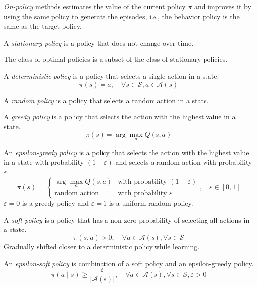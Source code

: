 \textit{On-policy} methods estimates the value of the current policy \( \pi \) and improves it by using the same policy to generate the episodes, i.e., the behavior policy is the same as the target policy.

A \textit{stationary policy} is a policy that does not change over time.

The class of optimal policies is a subset of the class of stationary policies.

A \textit{deterministic policy} is a policy that selects a single action in a state.
\begin{equation}
    \pi(s) = a, \quad \forall s \in \mathcal{S}, a \in \mathcal{A}(s)
\end{equation}

A \textit{random policy} is a policy that selects a random action in a state.

A \textit{greedy policy} is a policy that selects the action with the highest value in a state.
\begin{equation}
    \pi(s) = \arg\max_a Q(s, a)
\end{equation}

An \textit{epsilon-greedy policy} is a policy that selects the action with the highest value in a state with probability \( (1 - \varepsilon) \) and selects a random action with probability \( \varepsilon \).
\begin{equation}
    \pi(s) = \begin{cases}
        \arg\max_a Q(s, a)
         &
        \text{with probability } (1 - \varepsilon)
        \\
        \text{random action}
         &
        \text{with probability } \varepsilon
    \end{cases}
    , \quad \varepsilon \in [0, 1]
\end{equation}
\( \varepsilon = 0 \) is a greedy policy and \( \varepsilon = 1 \) is a uniform random policy.

A \textit{soft policy} is a policy that has a non-zero probability of selecting all actions in a state.
\begin{equation}
    \pi(s, a) > 0, \quad \forall a \in \mathcal{A}(s), \forall s \in \mathcal{S}
\end{equation}
Gradually shifted closer to a deterministic policy while learning.

An \textit{epsilon-soft policy} is combination of a soft policy and an epsilon-greedy policy.
\begin{equation}
    \pi(a \mid s) \geq \frac{\varepsilon}{|\mathcal{A}(s)|}, \quad \forall a \in \mathcal{A}(s), \forall s \in \mathcal{S}, \varepsilon > 0
\end{equation}
